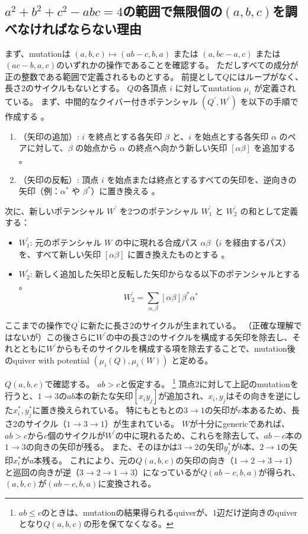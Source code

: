\documentclass[uplatex,12pt,dvipdfmx]{jsarticle}
\theoremstyle{definition}
\numberwithin{equation}{section}
\begin{document}
\subsection{$a^2+b^2+c^2-abc=4$の範囲で無限個の$(a,b,c)$を調べなければならない理由}
まず、mutationは $(a,b,c) \mapsto (ab-c,b,a)$ または $(a,bc-a,c)$ または $(ac-b,a,c)$のいずれかの操作であることを確認する。
ただしすべての成分が正の整数である範囲で定義されるものとする。
前提として$Q$にはループがなく、長さ2のサイクルもないとする。
$Q$の各頂点 $i$ に対してmutation $\mu_i$ が定義されている。
まず、中間的なクイバー付きポテンシャル $(Q^\prime, W^\prime)$ を以下の手順で作成する 。
\begin{enumerate}
	\item （矢印の追加）: $i$ を終点とする各矢印 $\beta$ と、$i$ を始点とする各矢印 $\alpha$ のペアに対して、$\beta$ の始点から $\alpha$ の終点へ向かう新しい矢印 $[\alpha\beta]$ を追加する 。
	\item （矢印の反転）: 頂点 $i$ を始点または終点とするすべての矢印を、逆向きの矢印（例：$\alpha^*$ や $\beta^*$）に置き換える 。
\end{enumerate}
次に、新しいポテンシャル $W^\prime$ を2つのポテンシャル $W^\prime_1$ と $W^\prime_2$ の和として定義する：
\begin{itemize}
	\item $W^\prime_1$: 元のポテンシャル $W$ の中に現れる合成パス $\alpha\beta$（$i$ を経由するパス）を、すべて新しい矢印 $[\alpha\beta]$ に置き換えたものとする 。
	\item $W^\prime_2$: 新しく追加した矢印と反転した矢印からなる以下のポテンシャルとする 。
	\begin{equation}
		W^\prime_2 = \sum_{\alpha, \beta} [\alpha\beta]\beta^*\alpha^*
	\end{equation}
\end{itemize}
ここまでの操作で$Q^\prime$に新たに長さ2のサイクルが生まれている。
（正確な理解ではないが）この後さらに$W^\prime$の中の長さ$2$のサイクルを構成する矢印を除去し、それとともに$W^\prime$からもそのサイクルを構成する項を除去することで、mutation後のquiver with potential $(\mu_i(Q), \mu_i(W))$ と定める。

$Q(a,b,c)$で確認する。
$ab>c$と仮定する。
\footnote{
	$ab\le c$のときは、mutationの結果得られるquiverが、$1$辺だけ逆向きのquiverとなり$Q(a,b,c)$の形を保てなくなる。
}
頂点$2$に対して上記のmutationを行うと、$1\to 3$の$ab$本の新たな矢印$[x_i y_j]$が追加され、$x_i,y_j$はその向きを逆にした$x_i^*,y_j^*$に置き換えられている。
特にもともとの$3\to1$の矢印が$c$本あるため、長さ2のサイクル（$1\to3\to1$）が生まれている。
$W$が十分にgenericであれば、$ab>c$から$c$個のサイクルが$W^\prime$の中に現れるため、これらを除去して、$ab-c$本の$1\to3$の向きの矢印が残る。
また、そのほかは$3\to2$の矢印$y_j^*$が$b$本、$2\to1$の矢印$x_i^*$が$a$本残る。
これにより、元の$Q(a,b,c)$の矢印の向き（$1\to2\to3\to1$）と巡回の向きが逆（$3\to2\to1\to3$）になっているが$Q(ab-c,b,a)$が得られ、$(a,b,c)$が$(ab-c,b,a)$に変換される。
\end{document}
